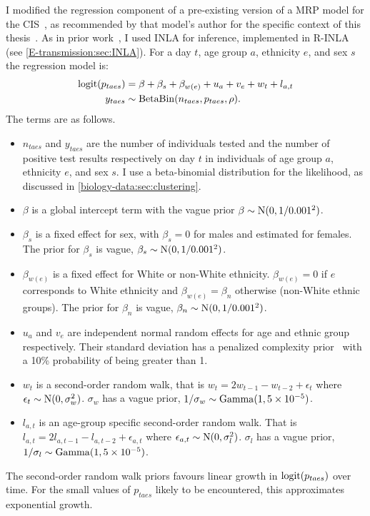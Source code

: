\documentclass[thesis.tex]{subfiles}
\begin{document}
I modified the regression component of a pre-existing version of a MRP model for the CIS~\autocite{pouwelsMRPvaccination}, as recommended by that model's author for the specific context of this thesis~.
As in prior work~\autocite{pouwelsMRPvaccination}, I used INLA for inference, implemented in R-INLA (see \cref{E-transmission:sec:INLA}).
For a day $t$, age group $a$, ethnicity $e$, and sex $s$ the regression model is:
\begin{align}
    \operatorname{logit}(p_{taes}) &= \beta + \beta_s + \beta_{w(e)} + u_a + v_e + w_t + l_{a,t} \\
    y_{taes} &\sim \operatorname{BetaBin}(n_{taes}, p_{taes}, \rho).
\end{align}
The terms are as follows.
\begin{itemize}
    \item $n_{taes}$ and $y_{taes}$ are the number of individuals tested and the number of positive test results respectively on day $t$ in individuals of age group $a$, ethnicity $e$, and sex $s$. I use a beta-binomial distribution for the likelihood, as discussed in \cref{biology-data:sec:clustering}.
    \item $\beta$ is a global intercept term with the vague prior $\beta \sim \operatorname{N}(0, 1/0.001^2)$.
    \item $\beta_s$ is a fixed effect for sex, with $\beta_s = 0$ for males and estimated for females. The prior for $\beta_s$ is vague, $\beta_s \sim \operatorname{N}(0, 1/0.001^2)$.
    \item $\beta_{w(e)}$ is a fixed effect for White or non-White ethnicity. $\beta_{w(e)} = 0$ if $e$ corresponds to White ethnicity and $\beta_{w(e)} = \beta_{n}$ otherwise (\ie non-White ethnic groups).
      The prior for $\beta_n$ is vague, $\beta_n \sim \operatorname{N}(0, 1/0.001^2)$.
    \item $u_a$ and $v_e$ are independent normal random effects for age and ethnic group respectively. Their standard deviation has a penalized complexity prior~\autocite{simpsonPenalising} with a 10\% probability of being greater than 1.
    \item $w_t$ is a second-order random walk, that is $w_t = 2w_{t-1} - w_{t-2} + \epsilon_t$ where $\epsilon_t \sim \operatorname{N}(0, \sigma_w^2)$.
      $\sigma_w$ has a vague prior, $1/\sigma_w \sim \operatorname{Gamma}(1, 5 \times 10^{-5})$.
    \item $l_{a,t}$ is an age-group specific second-order random walk.
      That is $l_{a,t} = 2l_{a,t-1} - l_{a,t-2} + \epsilon_{a,t}$ where $\epsilon_{a,t} \sim \operatorname{N}(0, \sigma_l^2)$.
      $\sigma_l$ has a vague prior, $1/\sigma_l \sim \operatorname{Gamma}(1, 5 \times 10^{-5})$.
\end{itemize}
The second-order random walk priors favours linear growth in $\operatorname{logit}(p_{taes})$ over time.
For the small values of $p_{taes}$ likely to be encountered, this approximates exponential growth.
\end{document}
